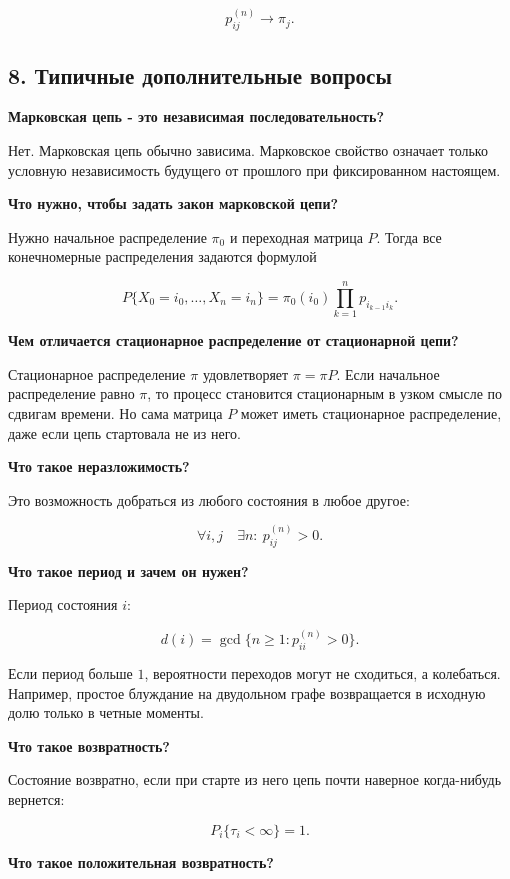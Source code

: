 \documentclass[
  11pt,
  a4paper,
]{article}
\begin{document}
\[
p_{ij}^{(n)}\to\pi_j.
\]

\subsection{8. Типичные дополнительные
вопросы}\label{ux442ux438ux43fux438ux447ux43dux44bux435-ux434ux43eux43fux43eux43bux43dux438ux442ux435ux43bux44cux43dux44bux435-ux432ux43eux43fux440ux43eux441ux44b}

\textbf{Марковская цепь - это независимая последовательность?}

Нет. Марковская цепь обычно зависима. Марковское свойство означает
только условную независимость будущего от прошлого при фиксированном
настоящем.

\textbf{Что нужно, чтобы задать закон марковской цепи?}

Нужно начальное распределение \(\pi_0\) и переходная матрица \(P\).
Тогда все конечномерные распределения задаются формулой

\[
P\{X_0=i_0,\ldots,X_n=i_n\}
=
\pi_0(i_0)\prod_{k=1}^n p_{i_{k-1}i_k}.
\]

\textbf{Чем отличается стационарное распределение от стационарной цепи?}

Стационарное распределение \(\pi\) удовлетворяет \(\pi=\pi P\). Если
начальное распределение равно \(\pi\), то процесс становится
стационарным в узком смысле по сдвигам времени. Но сама матрица \(P\)
может иметь стационарное распределение, даже если цепь стартовала не из
него.

\textbf{Что такое неразложимость?}

Это возможность добраться из любого состояния в любое другое:

\[
\forall i,j\quad \exists n:\ p_{ij}^{(n)}>0.
\]

\textbf{Что такое период и зачем он нужен?}

Период состояния \(i\):

\[
d(i)=\gcd\{n\ge1:p_{ii}^{(n)}>0\}.
\]

Если период больше \(1\), вероятности переходов могут не сходиться, а
колебаться. Например, простое блуждание на двудольном графе возвращается
в исходную долю только в четные моменты.

\textbf{Что такое возвратность?}

Состояние возвратно, если при старте из него цепь почти наверное
когда-нибудь вернется:

\[
P_i\{\tau_i<\infty\}=1.
\]

\textbf{Что такое положительная возвратность?}
\end{document}
